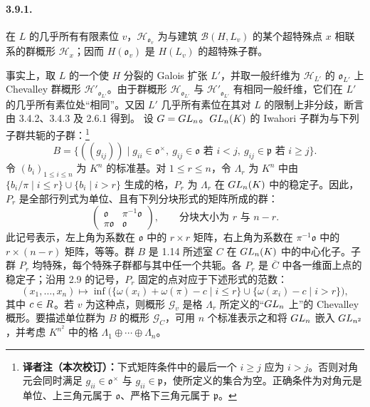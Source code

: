 \paragraph*{3.9.1.}在 $L$ 的几乎所有有限素位 $v$，$\mathscr H_{\mathfrak o_v}$ 为与建筑 $\mathscr B(H,L_v)$ 的某个超特殊点 $x$ 相联系的群概形 $\mathscr H_x$；因而 $H(\mathfrak o_v)$ 是 $H(L_v)$ 的超特殊子群。

事实上，取 $L$ 的一个使 $H$ 分裂的 Galois 扩张 $L'$，并取一般纤维为 $\mathscr H_{L'}$ 的 $\mathfrak o_{L'}$ 上 Chevalley 群概形 $\mathscr H'_{\mathfrak o_{L'}}$。由于群概形 $\mathscr H_{\mathfrak o_{L'}}$ 与 $\mathscr H'_{\mathfrak o_{L'}}$ 有相同一般纤维，它们在 $L'$ 的几乎所有素位处“相同”。又因 $L'$ 几乎所有素位在其对 $L$ 的限制上非分歧，断言由 3.4.2、3.4.3 及 2.6.1 得到。
设 $G=GL_n$。$GL_n(K)$ 的 Iwahori 子群为与下列子群共轭的子群：\nobreak\footnote{\textbf{译者注（本次校订）：}下式矩阵条件中的最后一个 $i\ge j$ 应为 $i>j$。否则对角元会同时满足 $g_{ii}\in\mathfrak o^\times$ 与 $g_{ii}\in\mathfrak p$，使所定义的集合为空。正确条件为对角元是单位、上三角元属于 $\mathfrak o$、严格下三角元属于 $\mathfrak p$。}
\[
B=\{((g_{ij}))\mid g_{ii}\in\mathfrak o^\times,\ g_{ij}\in\mathfrak o\text{ 若 }i<j,\ g_{ij}\in\mathfrak p\text{ 若 }i\geq j\}.
\]
令 $(b_i)_{1\leq i\leq n}$ 为 $K^n$ 的标准基。对 $1\leq r\leq n$，令 $\Lambda_r$ 为 $K^n$ 中由 $\{b_i/\pi\mid i\leq r\}\cup\{b_i\mid i>r\}$ 生成的格，$P_r$ 为 $\Lambda_r$ 在 $GL_n(K)$ 中的稳定子。因此，$P_r$ 是全部行列式为单位、且有下列分块形式的矩阵所成的群：
\[
\left(\begin{array}{c|c}
\mathfrak o&\pi^{-1}\mathfrak o\\\hline
\pi\mathfrak o&\mathfrak o
\end{array}\right),\qquad\text{分块大小为 }r\text{ 与 }n-r.
\]
此记号表示，左上角为系数在 $\mathfrak o$ 中的 $r\times r$ 矩阵，右上角为系数在 $\pi^{-1}\mathfrak o$ 中的 $r\times(n-r)$ 矩阵，等等。群 $B$ 是 1.14 所述室 $C$ 在 $GL_n(K)$ 中的中心化子。子群 $P_r$ 均特殊，每个特殊子群都与其中任一个共轭。各 $P_r$ 是 $\overline C$ 中各一维面上点的稳定子；沿用 2.9 的记号，$P_r$ 固定的点对应于下述形式的范数：
\[
(x_1,\ldots,x_n)\longmapsto\inf\bigl(
\{\omega(x_i)+\omega(\pi)-c\mid i\leq r\}\cup\{\omega(x_i)-c\mid i>r\}\bigr),
\]
其中 $c\in R$。若 $v$ 为这种点，则概形 $\mathscr G_v$ 是格 $\Lambda_r$ 所定义的“$GL_n$ 上”的 Chevalley 概形。要描述单位群为 $B$ 的概形 $\mathscr G_C$，可用 $n$ 个标准表示之和将 $GL_n$ 嵌入 $GL_{n^2}$，并考虑 $K^{n^2}$ 中的格 $\Lambda_1\oplus\cdots\oplus\Lambda_n$。

